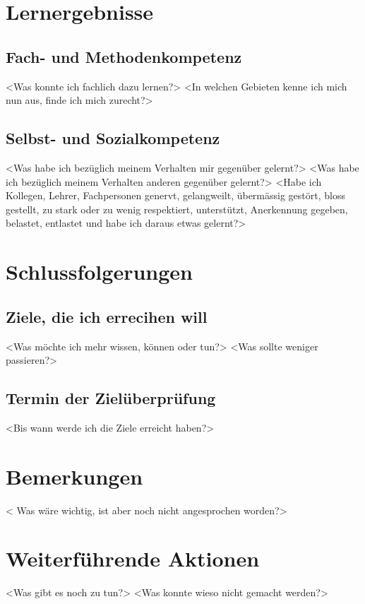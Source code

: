 \section{Lernergebnisse}
\subsection{Fach- und Methodenkompetenz}
<Was konnte ich fachlich dazu lernen?>
<In welchen Gebieten kenne ich mich nun aus, finde ich mich zurecht?>
\subsection{Selbst- und Sozialkompetenz}
<Was habe ich bezüglich meinem Verhalten mir gegenüber gelernt?>
<Was habe ich bezüglich meinem Verhalten anderen gegenüber gelernt?>
<Habe ich Kollegen, Lehrer, Fachpersonen genervt, gelangweilt, übermässig gestört, bloss gestellt, zu stark oder zu wenig respektiert, unterstützt, Anerkennung gegeben, belastet, entlastet und habe ich daraus etwas gelernt?>

\section{Schlussfolgerungen}
\subsection{Ziele, die ich errecihen will}
<Was möchte ich mehr wissen, können oder tun?>
<Was sollte weniger passieren?>
\subsection{Termin der Zielüberprüfung}
<Bis wann werde ich die Ziele erreicht haben?>

\section{Bemerkungen}
< Was wäre wichtig, ist aber noch nicht angesprochen worden?>

\section{Weiterführende Aktionen}
<Was gibt es noch zu tun?>
<Was konnte wieso nicht gemacht werden?>
